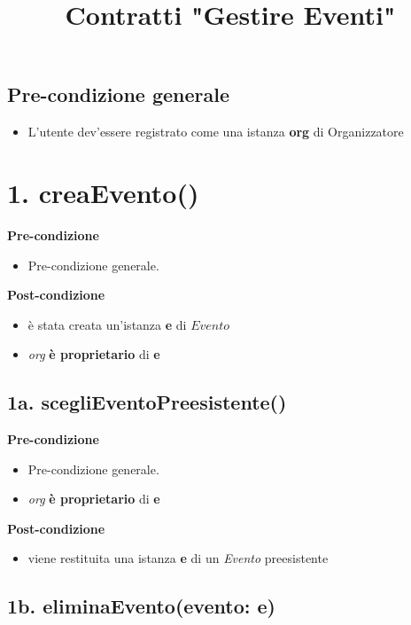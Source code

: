 \documentclass[14pt]{extarticle}
\begin{document}
\title{Contratti "Gestire Eventi"}
\date{}
\maketitle

\subsection*{Pre-condizione generale}

\begin{itemize}
  \item L'utente dev'essere registrato come una istanza \textbf{org} di Organizzatore
\end{itemize}

\section*{1. creaEvento()}

\textbf{Pre-condizione}
\begin{itemize}
  \item Pre-condizione generale.
\end{itemize}
\textbf{Post-condizione}
\begin{itemize}
  \item è stata creata un'istanza \textbf{e} di $Evento$
  \item \textit{org} \textbf{è proprietario} di \textbf{e}
\end{itemize}

\subsection*{1a. scegliEventoPreesistente()}
\textbf{Pre-condizione}
\begin{itemize}
  \item Pre-condizione generale.
  \item \textit{org} \textbf{è proprietario} di \textbf{e}
\end{itemize}
\textbf{Post-condizione}
\begin{itemize}
  \item viene restituita una istanza \textbf{e} di un \textit{Evento} preesistente
\end{itemize}

\subsection*{1b. eliminaEvento(evento: e)}
\end{document}
